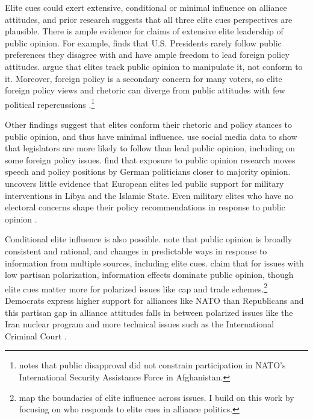 \documentclass[12pt]{article}
\begin{document}
Elite cues could exert extensive, conditional or minimal influence on alliance attitudes, and prior research suggests that all three elite cues perspectives are plausible. 
There is ample evidence for claims of extensive elite leadership of public opinion. 
For example, \citet{Canes-Wrone2006} finds that U.S. Presidents rarely follow public preferences they disagree with and have ample freedom to lead foreign policy attitudes. 
\citet{JacobsShapiro2000} argue that elites track public opinion to manipulate it, not conform to it.
Moreover, foreign policy is a secondary concern for many voters, so elite foreign policy views and rhetoric can diverge from public attitudes with few political repercussions \citep{BusbyMonten2012}.\footnote{\citet{Kreps2010} notes that public disapproval did not constrain participation in NATO's International Security Assistance Force in Afghanistan.}


Other findings suggest that elites conform their rhetoric and policy stances to public opinion, and thus have minimal influence. 
\citet{Barberaetal2019} use social media data to show that legislators are more likely to follow than lead public opinion, including on some foreign policy issues. 
\citet{HagerHilbig2020} find that exposure to public opinion research moves speech and policy positions by German politicians closer to majority opinion. 
\citet{Haesebrouck2019} uncovers little evidence that European elites led public support for military interventions in Libya and the Islamic State. 
Even military elites who have no electoral concerns shape their policy recommendations in response to public opinion \citep{LinGreenberg2021}. 


Conditional elite influence is also possible. 
\citet{PageShapiro1992} note that public opinion is broadly consistent and rational, and changes in predictable ways in response to information from multiple sources, including elite cues. 
\citet{GuisingerSaunders2017} claim that for issues with low partisan polarization, information effects dominate public opinion, though elite cues matter more for polarized issues like cap and trade schemes.\footnote{\citet{GuisingerSaunders2017} map the boundaries of elite influence across issues. I build on this work by focusing on who responds to elite cues in alliance politics.}
Democrats express higher support for alliances like NATO than Republicans \citep{PewNATO2020} and this partisan gap in alliance attitudes falls in between polarized issues like the Iran nuclear program and more technical issues such as the International Criminal Court \citet{GuisingerSaunders2017}. 
\end{document}
